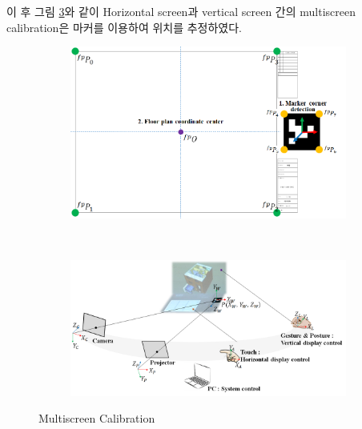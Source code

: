 이 후 그림 \ref{fig:multiscreen_calibration}와 같이 Horizontal screen과 vertical screen 간의 multiscreen calibration은 마커를 이용하여 위치를 추정하였다. 
\begin{figure}[!ht]
	\centering
        \begin{subfigure}[b]{0.8\textwidth}
            \centering
           \includegraphics[width=\textwidth]{3-System/marker_calibration1}
                \caption{}
                \label{fig:marker_1}
        \end{subfigure}
        \\
        \begin{subfigure}[b]{0.8\textwidth}
	        \centering
              \includegraphics[width=\columnwidth]{3-System/marker_calibration2}
              \caption{}
              \label{fig:hardware}
        \end{subfigure}%
	\caption{Multiscreen Calibration}
    \label{fig:multiscreen_calibration}
\end{figure}


